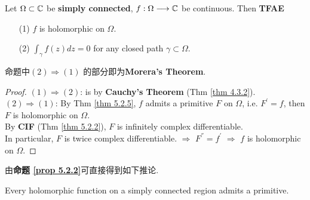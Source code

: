 	\begin{proposition}\label{prop 5.2.2}
		Let $\Omega \subset \mathbb{C}$ be \textbf{simply connected}, $f : \Omega \longrightarrow \mathbb{C}$ be continuous. Then \textbf{TFAE}
		\begin{enumerate}
			\item[(1)]$f$ is holomorphic on $\Omega$.
			
			\item[(2)]$\int_{\gamma}{f(z) dz} = 0$ for any closed path $\gamma \subset \Omega$. 
		\end{enumerate}
		
		\vspace{1em}
		\begin{rmk}
			命题中$(2) \Rightarrow (1)$ 的部分即为\textbf{Morera's Theorem}.
		\end{rmk}
	
		\vspace{1em}
		\begin{proof}
			$(1) \Rightarrow (2)$: is by \textbf{Cauchy's Theorem} (Thm \ref{thm 4.3.2}). \\
			$(2) \Rightarrow (1)$: By Thm \ref{thm 5.2.5}, $f$ admits a primitive $F$ on $\Omega$, i.e. $F^{'} = f$, then $F$ is holomorphic on $\Omega$. \\
			By \textbf{CIF} (Thm \ref{thm 5.2.2}), $F$ is infinitely complex differentiable. \\
			In particular, $F$ is twice complex differentiable. $\Rightarrow$ $F^{''} = f^{'}$ $\Rightarrow$ $f$ is holomorphic on $\Omega$. 
		\end{proof}
	\end{proposition}

	\newpage
	由\textbf{命题 \ref{prop 5.2.2}}可直接得到如下推论.
	\begin{corollary}\label{cor 5.2.6}
		Every holomorphic function on a simply connected region admits a primitive.
	\end{corollary}

